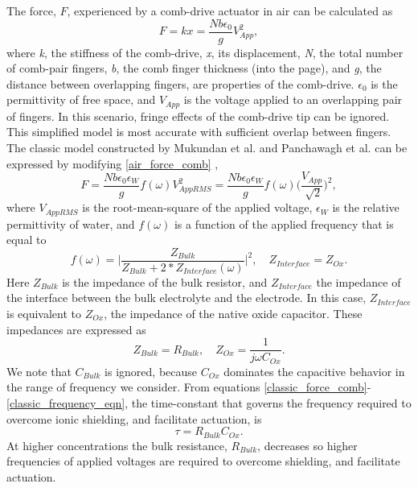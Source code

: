 The force, $F$, experienced by a comb-drive actuator in air can be calculated as
\begin{equation}\label{air_force_comb} 
F = kx = \dfrac{Nb\epsilon_0}{g}V_{App}^2,
\end{equation}
where \textit{k}, the stiffness of the comb-drive, \textit{x}, its displacement, \textit{N}, the total number of comb-pair fingers, \textit{b}, the comb finger thickness (into the page), and \textit{g}, the distance between overlapping fingers, are properties of the comb-drive.  $\epsilon_0$ is the permittivity of free space, and $V_{App}$ is the voltage applied to an overlapping pair of fingers. In this scenario, fringe effects of the comb-drive tip can be ignored. This simplified model is most accurate with sufficient overlap between fingers\cite{Ye1998}. The classic model constructed by Mukundan et al. and Panchawagh et al. can be expressed by modifying \ref{air_force_comb} \cite{MukundanandPonce2009,Panchawagh2009},
\begin{equation}\label{classic_force_comb}  
F = \dfrac{Nb\epsilon_0\epsilon_W}{g}f(\omega)V_{AppRMS}^2 = \dfrac{Nb\epsilon_0\epsilon_W}{g}f(\omega)\bigg(\dfrac{V_{App}}{\sqrt[]{2}}\bigg)^2,
\end{equation}
where $V_{AppRMS}$ is the root-mean-square of the applied voltage, $\epsilon_W$ is the relative permittivity of water, and $f(\omega)$ is a function of the applied frequency that is equal to \cite{MukundanandPonce2009,Panchawagh2009}
\begin{equation} \label{classic_frequency_eqn}
f(\omega) = \bigg|\dfrac{Z_{Bulk}}{Z_{Bulk}+2*Z_{Interface}(\omega)}\bigg| ^2, \quad Z_{Interface}=Z_{Ox}.
\end{equation}
Here $Z_{Bulk}$ is the impedance of the bulk resistor, and $Z_{Interface}$ the impedance of the interface between the bulk electrolyte and the electrode. In this case, $Z_{Interface}$ is equivalent to $Z_{Ox}$, the impedance of the native oxide capacitor. These impedances are expressed as 
\begin{equation} \label{bulk_oxide_impedances}
Z_{Bulk} = R_{Bulk}, \quad Z_{Ox} = \dfrac{1}{j\omega C_{Ox}}.
\end{equation}
We note that $C_{Bulk}$ is ignored, because $C_{Ox}$ dominates the capacitive behavior in the range of frequency we consider. From equations \ref{classic_force_comb}-\ref{classic_frequency_eqn}, the time-constant that governs the frequency required to overcome ionic shielding, and facilitate actuation, is \cite{MukundanandPonce2009,Panchawagh2009}
\begin{equation} \label{classic_timeconst}
\tau = R_{Bulk}C_{Ox}.
\end{equation}
At higher concentrations the bulk resistance, $R_{Bulk}$, decreases so higher frequencies of applied voltages are required to overcome shielding, and facilitate actuation. 

